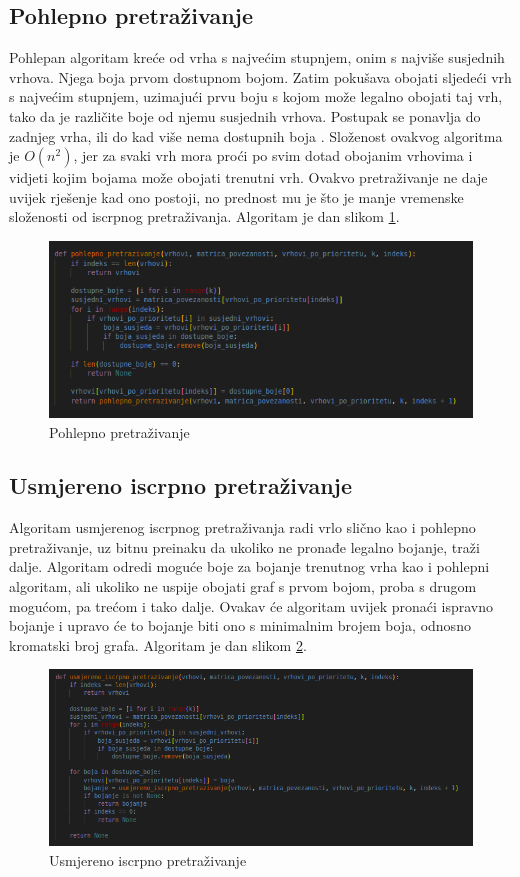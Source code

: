 \documentclass[times, utf8, zavrsni, numeric]{fer}
\begin{document}
\subsection{Pohlepno pretraživanje}
Pohlepan algoritam kreće od vrha s najvećim stupnjem, onim s najviše susjednih vrhova. Njega boja prvom dostupnom bojom. Zatim pokušava obojati sljedeći vrh s najvećim stupnjem, uzimajući prvu boju s kojom može legalno obojati taj vrh, tako da je različite boje od njemu susjednih vrhova. Postupak se ponavlja do zadnjeg vrha, ili do kad više nema dostupnih boja \cite{cranston2015brooks}. Složenost ovakvog algoritma je $O(n^2)$, jer za svaki vrh mora proći po svim dotad obojanim vrhovima i vidjeti kojim bojama može obojati trenutni vrh. Ovakvo pretraživanje ne daje uvijek rješenje kad ono postoji, no prednost mu je što je manje vremenske složenosti od iscrpnog pretraživanja. Algoritam je dan slikom \ref{fig:pohlepno pretrazivanje}.

\begin{figure}[htb]
\centering
\includegraphics[width=12cm]{images/pohlepni_algoritam.png}
\caption{Pohlepno pretraživanje}
\label{fig:pohlepno pretrazivanje}
\end{figure}


\subsection{Usmjereno iscrpno pretraživanje}
Algoritam usmjerenog iscrpnog pretraživanja radi vrlo slično kao i pohlepno pretraživanje, uz bitnu preinaku da ukoliko ne pronađe legalno bojanje, traži dalje. Algoritam odredi moguće boje za bojanje trenutnog vrha kao i pohlepni algoritam, ali ukoliko ne uspije obojati graf s prvom bojom, proba s drugom mogućom, pa trećom i tako dalje. Ovakav će algoritam uvijek pronaći ispravno bojanje i upravo će to bojanje biti ono s minimalnim brojem boja, odnosno kromatski broj grafa. Algoritam je dan slikom \ref{fig:iscrpno usmjereno pretrazivanje}.

\begin{figure}[htb]
\centering
\includegraphics[width=12cm]{images/iscrpno_usmjereno_pretrazivanje.png}
\caption{Usmjereno iscrpno pretraživanje}
\label{fig:iscrpno usmjereno pretrazivanje}
\end{figure}
\end{document}
